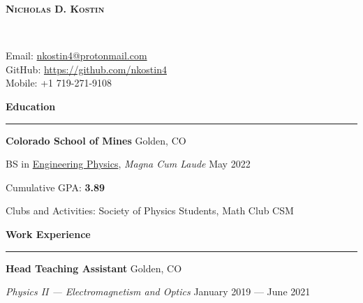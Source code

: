 \documentclass{article}
\begin{document}
\thispagestyle{empty}

\begin{minipage}{0.63\textwidth}
\begin{flushleft}
\textsc{\Huge{\textbf{Nicholas D. Kostin}}}
\end{flushleft}
\end{minipage}
~
\begin{minipage}{0.35\textwidth}
\begin{flushright}
\parbox[c]{\textwidth}{Email: \href{mailto:nkostin4@protonmail.com}{nkostin4@protonmail.com} \\ GitHub: \url{https://github.com/nkostin4} \\ Mobile: +1 719-271-9108}
\end{flushright}
\end{minipage}

\vspace{1.6em}

\textbf{\Large{Education}} \\[-0.5em]
\rule{\textwidth}{1pt}

\hspace{1.5em} \textbf{Colorado School of Mines} \hfill Golden, CO

\hspace{1.5em} BS in \href{https://physics.mines.edu/}{Engineering Physics}, \emph{Magna Cum Laude} \hfill May 2022

\vspace{1em}

\hspace{1.5em} Cumulative GPA: \textbf{3.89}

\vspace{1em}

\hspace{1.5em} Clubs and Activities: Society of Physics Students, Math Club CSM

\vspace{1em}

\textbf{\Large{Work Experience}} \\[-0.5em]
\rule{\textwidth}{1pt}

\hspace{1.5em} \textbf{Head Teaching Assistant} \hfill Golden, CO

\hspace{1.5em} \textit{Physics II --- Electromagnetism and Optics} \hfill January 2019 --- June 2021
\end{document}
